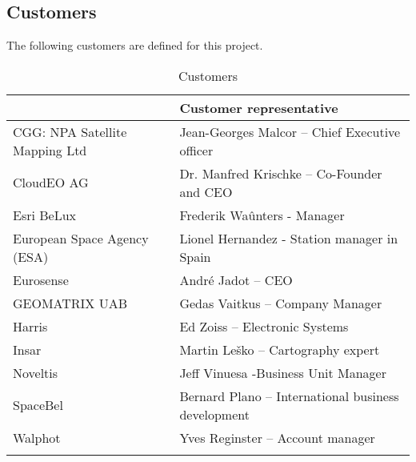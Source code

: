 \subsection{Customers}

{The following customers are defined for this project.}
\begin{table}[H]
	\centering
	\caption{Customers}
	\label{my-label}
	\begin{tabular}{ll}
		\hline
		\rowcolor[HTML]{C0C0C0} 
		\multicolumn{1}{|l|}{\cellcolor[HTML]{C0C0C0}Customer group} & \multicolumn{1}{l|}{\cellcolor[HTML]{C0C0C0}Customer representative}    \\ \hline
		\multicolumn{1}{|l|}{CGG: NPA Satellite Mapping Ltd}         & \multicolumn{1}{l|}{Jean-Georges Malcor – Chief Executive officer}      \\ \hline
		\multicolumn{1}{|l|}{CloudEO AG}                             & \multicolumn{1}{l|}{Dr. Manfred Krischke – Co-Founder and CEO}          \\ \hline
		\multicolumn{1}{|l|}{Esri BeLux}                             & \multicolumn{1}{l|}{Frederik Waûnters - Manager}                        \\ \hline
		\multicolumn{1}{|l|}{European Space Agency (ESA)}            & \multicolumn{1}{l|}{Lionel Hernandez - Station manager in Spain}                                                   \\ \hline
		\multicolumn{1}{|l|}{Eurosense}                              & \multicolumn{1}{l|}{André Jadot – CEO}                                  \\ \hline
		\multicolumn{1}{|l|}{GEOMATRIX UAB}                          & \multicolumn{1}{l|}{Gedas Vaitkus – Company Manager}                    \\ \hline
		\multicolumn{1}{|l|}{Harris}                                 & \multicolumn{1}{l|}{Ed Zoiss – Electronic Systems}                      \\ \hline
		\multicolumn{1}{|l|}{Insar}                                  & \multicolumn{1}{l|}{Martin Leško – Cartography expert}                  \\ \hline
		\multicolumn{1}{|l|}{Noveltis}                               & \multicolumn{1}{l|}{Jeff Vinuesa -Business Unit Manager}                \\ \hline
		\multicolumn{1}{|l|}{SpaceBel}                               & \multicolumn{1}{l|}{Bernard Plano – International business development} \\ \hline
		\multicolumn{1}{|l|}{Walphot}                                & \multicolumn{1}{l|}{Yves Reginster – Account manager}                   \\ \hline
		&                                                                        
	\end{tabular}
\end{table}